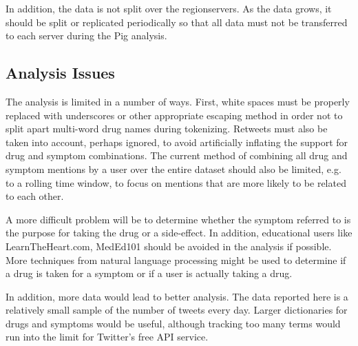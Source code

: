 \documentclass[letterpaper]{article}
\begin{document}
In addition, the data is not split over the regionservers. As the data grows, it should be split or replicated periodically so that all data must not be transferred to each server during the Pig analysis.

\subsection{Analysis Issues}
The analysis is limited in a number of ways. First, white spaces must be properly replaced with underscores or other appropriate escaping method in order not to split apart multi-word drug names during tokenizing. Retweets must also be taken into account, perhaps ignored, to avoid artificially inflating the support for drug and symptom combinations. The current method of combining all drug and symptom mentions by a user over the entire dataset should also be limited, e.g. to a rolling time window, to focus on mentions that are more likely to be related to each other.

A more difficult problem will be to determine whether the symptom referred to is the purpose for taking the drug or a side-effect. In addition, educational users like LearnTheHeart.com, MedEd101 should be avoided in the analysis if possible. More techniques from natural language processing might be used to determine if a drug is taken for a symptom or if a user is actually taking a drug. 

In addition, more data would lead to better analysis. The data reported here is a relatively small sample of the number of tweets every day. Larger dictionaries for drugs and symptoms would be useful, although tracking too many terms would run into the limit for Twitter's free API service.

%
%


\end{document}
